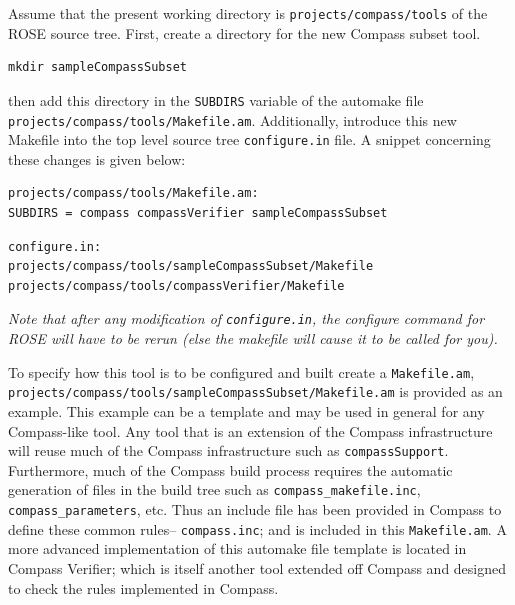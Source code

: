 Assume that the present working directory is {\tt projects/compass/tools} 
of the ROSE source tree. First, create a directory for the new Compass 
subset tool.
%
\begin{verbatim}
mkdir sampleCompassSubset
\end{verbatim}
%
then add this directory in the {\tt SUBDIRS} variable of the automake file
{\tt projects/compass/tools/Makefile.am}. Additionally, introduce this new 
Makefile into the top level source tree {\tt configure.in} file. A snippet 
concerning these changes is given below:
%
\begin{verbatim}
projects/compass/tools/Makefile.am:
SUBDIRS = compass compassVerifier sampleCompassSubset
\end{verbatim}
%
\begin{verbatim}
configure.in:
projects/compass/tools/sampleCompassSubset/Makefile
projects/compass/tools/compassVerifier/Makefile
\end{verbatim}
%
{\it Note that after any modification of {\tt configure.in}, the configure command
for ROSE will have to be rerun (else the makefile will cause it to be called
for you).}

\vspace{0.2in}

To specify how this tool is to be configured and built create a 
{\tt Makefile.am},
{\tt projects/compass/tools/sampleCompassSubset/Makefile.am} is provided as an 
example.
This example can be a template and may be used in general for any Compass-like 
tool.
Any tool that is an extension of the Compass infrastructure will reuse much of 
the Compass infrastructure such as {\tt compassSupport}.
Furthermore, much of the Compass build
process requires the automatic generation of files in the build tree such
as {\tt compass\_makefile.inc}, {\tt compass\_parameters}, etc. Thus an
include file has been provided in Compass to define these common rules--
{\tt compass.inc}; and is included in this {\tt Makefile.am}.
A more advanced implementation of this automake file template is located in
Compass Verifier; which is itself another tool extended off Compass and
designed to check the rules implemented in Compass.

